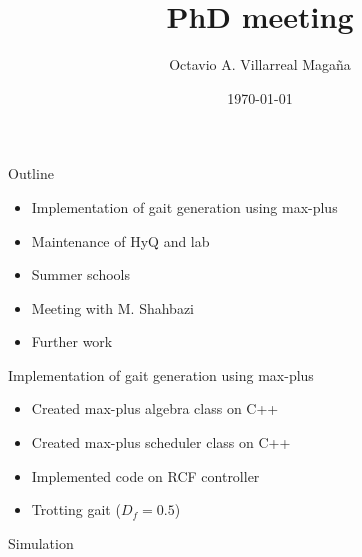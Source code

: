 \documentclass{beamer}
\title[PhD meeting: Planning and Control]{PhD meeting \vspace{15pt}}
\institute[]{Istituto Italiano di Tecnologia, Genova, Italy \vspace{20pt}}
\author{Octavio A. Villarreal Maga\~na \vspace{20pt}} %
\date{\today}
\newcommand*\titleTOC{Outline}
\begin{document}
{
\frame{\titlepage}
}

{
}



\begin{frame}{Outline}
	\begin{itemize}\setlength\itemsep{2em}
		\item Implementation of gait generation using max-plus
		\item Maintenance of HyQ and lab
		\item Summer schools 
		\item Meeting with M. Shahbazi 
		\item Further work
	\end{itemize}
\end{frame}

\begin{frame}{Implementation of gait generation using max-plus}
\begin{itemize}\setlength\itemsep{3em}
\item Created max-plus algebra class on C++
\item Created max-plus scheduler class on C++
\item Implemented code on RCF controller
\item Trotting gait ($D_f = 0.5$)
\end{itemize}
\end{frame}


\begin{frame}{Simulation}
 \\
\end{frame}
\end{document}

